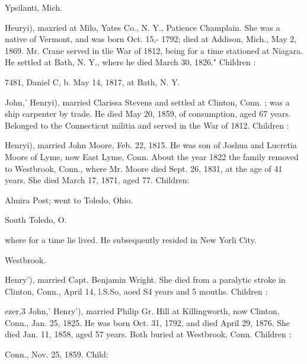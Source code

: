 \documentclass{book}
\begin{document}
Ypsilanti, Mich. 



Heuryi), maxried at Milo, Yates Co., N. Y., Patience Champlain. 
She was a native of Vermont, and was born Oct. 15,- 1792; died 
at Addison, Mich., May 2, 1869. Mr. Crane served in tlie War 
of 1812, being for a time stationed at Niagara. He settled at 
Bath, N. Y., where he died March 30, 1826." Children : 

7481, Daniel C, b. May 14, 1817, at Bath, N. Y. 

John,' Henryi), married Clarissa Stevens and settled at Clinton, 
Conn. ; was a ship carpenter by trade. He died May 20, 1859, 
of consumption, aged 67 years. Belonged to the Connecticut 
militia and served in the War of 1812. Children : 


Henryi), married John Moore, Feb. 22, 1815. He was son of 
Joshua and Lucretia Moore of Lyme, now East Lyme, Conn. 
About the year 1822 the family removed to Westbrook, Conn., 
where Mr. Moore died Sept. 26, 1831, at the age of 41 years. 
She died March 17, 1871, aged 77. Children: 


Almira Post; went to Toledo, Ohio. 








South Toledo, O. 













where for a time lie lived. He subsequently resided in New 
Yorli City. 


Westbrook. 

Henry'), married Capt. Benjamin Wright. She died from a 
paralytic stroke in Clinton, Conn., April 14, l.S.So, aoed S4 years 
and 5 mouths. Children : 








ezer,3 John,' Henry'), married Philip Gr. Hill at Killingworth, 
now Clinton, Conn., Jan. 25, 1825. He was born Oct. 31, 1792, 
and died April 29, 1876. She died Jan. 11, 1858, aged 57 years. 
Both buried at Westbrook, Conn. Children : 








Conn., Nov. 25, 1859. Child: 
\end{document}
